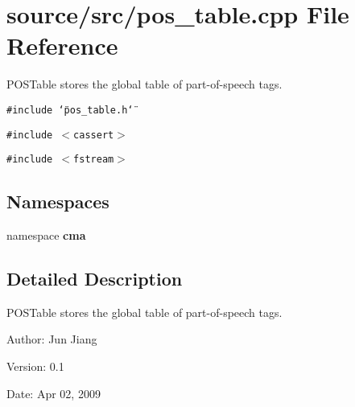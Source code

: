 \section{source/src/pos\_\-table.cpp File Reference}
\label{pos__table_8cpp}
POSTable stores the global table of part-of-speech tags. 

{\tt \#include \char`\"{}pos\_\-table.h\char`\"{}}\par
{\tt \#include $<$cassert$>$}\par
{\tt \#include $<$fstream$>$}\par
\subsection*{Namespaces}
\begin{CompactItemize}
\item 
namespace \textbf{cma}
\end{CompactItemize}


\subsection{Detailed Description}
POSTable stores the global table of part-of-speech tags. 

\begin{Desc}
\item[Author:]Jun Jiang \end{Desc}
\begin{Desc}
\item[Version:]0.1 \end{Desc}
\begin{Desc}
\item[Date:]Apr 02, 2009 \end{Desc}
